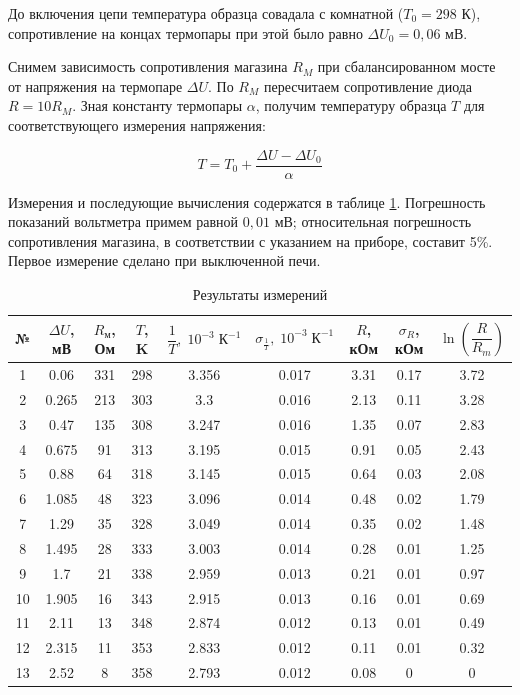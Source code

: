 \documentclass[12pt]{kiarticle} %
\begin{document}
	До включения цепи температура образца совадала с комнатной  ($T_0 = 298$ К), сопротивление на концах термопары при этой было равно $\Delta U_{0} = 0,06$ мВ.
	
	Снимем зависимость сопротивления магазина $R_M$ при сбалансированном мосте от напряжения на термопаре $\Delta U$. По $R_M$ пересчитаем сопротивление диода $R = 10R_M$. Зная константу термопары $\alpha$,  получим температуру образца $T$ для соответствующего измерения напряжения: 
	
	\[ T = T_0 + \frac{\Delta U - \Delta U_{0}}{\alpha} \] 
	
	Измерения и последующие вычисления содержатся в таблице \ref{table_5}. Погрешность показаний вольтметра примем равной $ 0,01 $ мВ; относительная погрешность сопротивления магазина, в соответствии с указанием на приборе, составит 5\%. Первое измерение сделано при выключенной печи. 
	
		\begin{table}[h]
		\caption{Результаты измерений}
		\begin{center}
			\begin{tabular}{|c|c|c|c|c|c|c|c|c|}
				\hline
				№ & $ \Delta U  $, мВ & $ R_м $, Ом &  $ T $, K & $ \dfrac{1}{T}, \; 10^{-3} \; К^{-1} $ & $ \sigma_{\frac{1}{T}}, \; 10^{-3} \; К^{-1}  $ &  $ R $, кОм & $ \sigma_R $, кОм &  $ \ln \left( \dfrac{R}{R_m} \right)  $ \\
				\hline
			1 & 0.06 & 331 & 298 & 3.356 & 0.017 & 3.31 & 0.17 & 3.72 \\
			2 & 0.265 & 213 & 303 & 3.3 & 0.016 & 2.13 & 0.11 & 3.28 \\
			3 & 0.47 & 135 & 308 & 3.247 & 0.016 & 1.35 & 0.07 & 2.83 \\
			4 & 0.675 & 91 & 313 & 3.195 & 0.015 & 0.91 & 0.05 & 2.43 \\
			5 & 0.88 & 64 & 318 & 3.145 & 0.015 & 0.64 & 0.03 & 2.08 \\
			6 & 1.085 & 48 & 323 & 3.096 & 0.014 & 0.48 & 0.02 & 1.79 \\
			7 & 1.29 & 35 & 328 & 3.049 & 0.014 & 0.35 & 0.02 & 1.48 \\
			8 & 1.495 & 28 & 333 & 3.003 & 0.014 & 0.28 & 0.01 & 1.25 \\
			9 & 1.7 & 21 & 338 & 2.959 & 0.013 & 0.21 & 0.01 & 0.97 \\
			10 & 1.905 & 16 & 343 & 2.915 & 0.013 & 0.16 & 0.01 & 0.69 \\
			11 & 2.11 & 13 & 348 & 2.874 & 0.012 & 0.13 & 0.01 & 0.49 \\
			12 & 2.315 & 11 & 353 & 2.833 & 0.012 & 0.11 & 0.01 & 0.32 \\
			13 & 2.52 & 8 & 358 & 2.793 & 0.012 & 0.08 & 0 & 0 \\
			\hline
			\end{tabular}
		\end{center}
		\label{table_5}
	\end{table}
\end{document}
